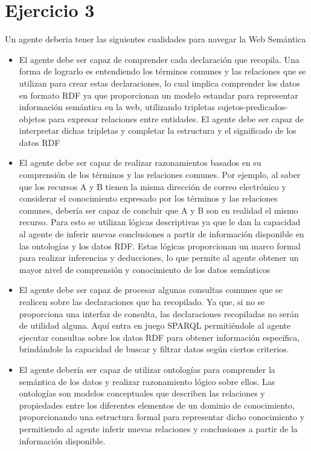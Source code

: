 \section{Ejercicio 3}
Un agente deberia tener las siguientes cualidades para navegar la Web Semántica
\begin{itemize}
  \item El agente debe ser capaz de comprender cada declaración que recopila. Una forma de lograrlo es entendiendo los términos comunes y las relaciones que se utilizan para crear estas declaraciones, lo cual implica comprender los datos en formato RDF ya que proporcionan un modelo estandar para representar información semántica en la web, utilizando tripletas sujetos-predicados-objetos para expresar relaciones entre entidades. El agente debe ser capaz de interpretar dichas tripletas y completar la estructura y el significado de los datos RDF

  \item El agente debe ser capaz de realizar razonamientos basados en su comprensión de los términos y las relaciones comunes. Por ejemplo, al saber que los recursos A y B tienen la misma dirección de correo electrónico y considerar el conocimiento expresado por los términos y las relaciones comunes, debería ser capaz de concluir que A y B son en realidad el mismo recurso. Para esto se utilizan lógicas descriptivas ya que le dan la capacidad al agente de inferir nuevas conclusiones a partir de información disponible en las ontologías y los datos RDF. Estas lógicas proporcionan un marco formal para realizar inferencias y deducciones, lo que permite al agente obtener un mayor nivel de comprensión y conocimiento de los datos semánticos

  \item El agente debe ser capaz de procesar algunas consultas comunes que se realicen sobre las declaraciones que ha recopilado. Ya que, si no se proporciona una interfaz de consulta, las declaraciones recopiladas no serán de utilidad alguna. Aquí entra en juego SPARQL permitiéndole al agente ejecutar consultas sobre los datos RDF para obtener información especifica, brindándole la capacidad de buscar y filtrar datos según ciertos criterios.
  
  \item El agente debería ser capaz de utilizar ontologías para comprender la semántica de los datos y realizar razonamiento lógico sobre ellos. Las ontologías son modelos conceptuales que describen las relaciones y propiedades entre los diferentes elementos de un dominio de conocimiento, proporcionando una estructura formal para representar dicho conocimiento y permitiendo al agente inferir nuevas relaciones y conclusiones a partir de la información disponible.
\end{itemize}

